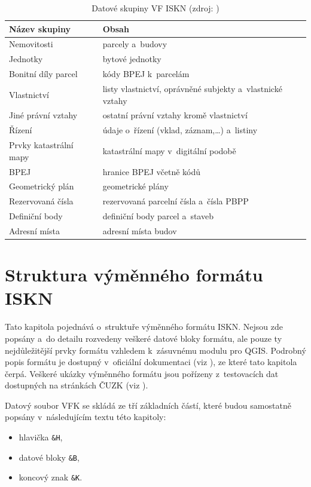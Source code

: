 \documentclass[a4paper,12pt,oneside]{book}
\begin{document}
\begin{table}[htbp]
\centering
\caption[Datové skupiny VF ISKN]{Datové skupiny VF ISKN (zdroj: \cite{nvf_cuzk})}
\begin{tabular}{ll}
\toprule
\textbf{Název skupiny} & \textbf{Obsah} \\ 
\midrule
Nemovitosti & parcely a~budovy \\ 
Jednotky & bytové jednotky \\ 
Bonitní díly parcel & kódy BPEJ k~parcelám \\ 
Vlastnictví & \parbox{220pt}{listy vlastnictví, oprávněné subjekty a~vlastnické vztahy} \\ 
Jiné právní vztahy & ostatní právní vztahy kromě vlastnictví \\ 
Řízení & údaje o~řízení (vklad, záznam,…) a~listiny \\ 
Prvky katastrální mapy & katastrální mapy v~digitální podobě \\ 
BPEJ & hranice BPEJ včetně kódů \\ 
Geometrický plán & geometrické plány \\ 
Rezervovaná čísla & rezervovaná parcelní čísla a~čísla PBPP \\ 
Definiční body & definiční body parcel a~staveb \\ 
Adresní místa & adresní místa budov \\
\bottomrule
\end{tabular}
\label{t_datove_skupiny}
\end{table}

\newpage
\section{Struktura výměnného formátu ISKN}

Tato kapitola pojednává o~struktuře výměnného formátu ISKN. Nejsou zde
popsány a~do detailu rozvedeny veškeré datové bloky formátu, ale pouze
ty nejdůležitější prvky formátu vzhledem k~zásuvnému modulu pro
QGIS. Podrobný popis formátu je dostupný v~oficiální dokumentaci
(viz \cite{vfk_struktura}), ze které tato kapitola čerpá. Veškeré ukázky
výměnného formátu jsou pořízeny z~testovacích dat dostupných na
stránkách ČUZK (viz \cite{nvf_cuzk}).

Datový soubor VFK se skládá ze tří základních částí, které
budou samostatně popsány v~následujícím textu této kapitoly:

\begin{itemize}
 \item hlavička \texttt{\&H},
 \item datové bloky \texttt{\&B},
 \item koncový znak \texttt{\&K}.
\end{itemize}
\end{document}
